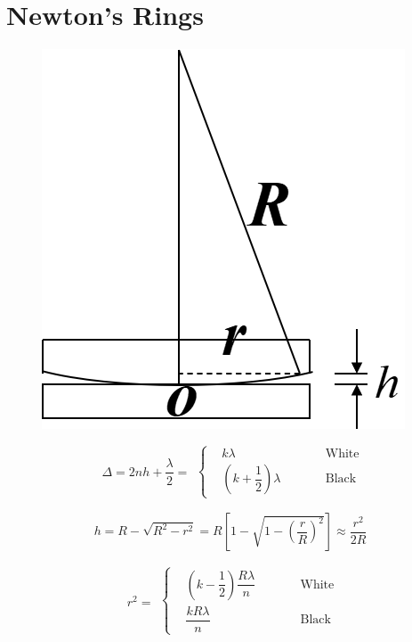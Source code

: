 \section{Newton's Rings}

\begin{figure}[H]
  \centering
  \includegraphics[width=0.4\linewidth]{figures/Newton-Ring}
\end{figure}

\begin{equation*}
  \begin{aligned}
    \Delta = 2 n h + \dfrac{\lambda}{2} = 
  \end{aligned}
  \left\{
    \begin{aligned}
      & k \lambda && \quad\quad \text{White} \\
      & \left( k + \dfrac{1}{2}  \right) \lambda && \quad\quad \text{Black}
    \end{aligned}
  \right.
\end{equation*}

\begin{equation*}
  \begin{aligned}
    h = R - \sqrt{R^2 - r^2} = R \left[ 1 - \sqrt{1 - \left( \dfrac{r}{R}  \right)^2 } \right] \approx \dfrac{r^2}{2R} 
  \end{aligned}
\end{equation*}

\begin{equation*}
  \begin{aligned}
    r^2 = 
  \end{aligned}
  \left\{
    \begin{aligned}
      & \left( k - \dfrac{1}{2}  \right) \dfrac{R \lambda}{n} && \quad\quad \text{White} \\
      & \dfrac{k R \lambda}{n} && \quad\quad \text{Black} 
    \end{aligned}
  \right.
\end{equation*}

